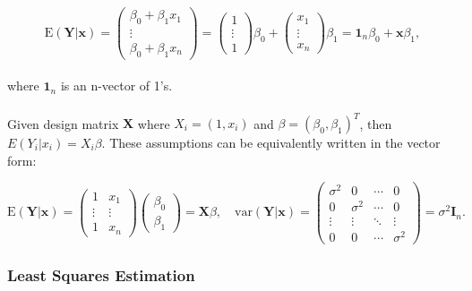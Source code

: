 \documentclass{article}\usepackage[]{graphicx}\usepackage[]{xcolor}
\numberwithin{equation}{section}
\begin{document}
\begin{equation}\label{eq:4-1}
\mathrm{E}(\mathbf{Y} | \mathbf{x}) =
\left( \begin{array}{ccc}
\beta_0+\beta_1 x_1\\
\vdots\\
\beta_0+\beta_1 x_n
\end{array} \right) = 
\left( \begin{array}{ccc}
1\\
\vdots\\
1
\end{array} \right) \beta_0 + 
\left( \begin{array}{ccc}
x_1\\
\vdots\\
x_n
\end{array} \right) \beta_1 =
\mathbf{1}_n \beta_0 + \mathbf{x} \beta_1 ,
\end{equation}
\\
\noindent
where $\mathbf{1}_n$ is an n-vector of 1's.
\\  
\\Given design matrix $\mathbf{X}$ where $X_i = (1, x_i)$ and $\beta = (\beta_0, \beta_1)^T$, then $E(Y_i|x_i) = X_i \beta$. These assumptions can be equivalently written in the vector form:

\begin{equation}\label{eq:4-2}
\mathrm{E}(\mathbf{Y} | \mathbf{x}) = 
\left( \begin{array}{cc}
1 & x_1\\
\vdots& \vdots\\
1 & x_n
\end{array} \right) 
\left( \begin{array}{cc}
\beta_0 \\
\beta_1
\end{array} \right) = \mathbf{X} \beta, \quad 
\text{var}(\mathbf{Y} | \mathbf{x}) =
\begin{pmatrix}
\sigma^2 & 0 & \cdots & 0 \\
0 & \sigma^2 & \cdots & 0 \\
\vdots & \vdots & \ddots & \vdots \\
0 & 0 & \cdots & \sigma^2
\end{pmatrix} = \sigma^2 \mathbf{I}_n.
\end{equation}

\subsubsection{Least Squares Estimation}
\end{document}
